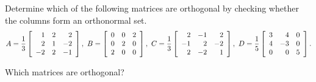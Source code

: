 \documentclass{ximera}
\begin{document}
\begin{problem}
  Determine which of the following matrices are orthogonal by checking
  whether the columns form an orthonormal set.
  \begin{equation*}
    A = \frac{1}{3}
    \startmat{rrr}
      1  &  2 &  2 \\
      2  &  1 & -2 \\
      -2 &  2 & -1 \\
    \stopmat,
    \quad
    B = \startmat{rrr}
      0 & 0 & 2 \\
      0 & 2 & 0 \\
      2 & 0 & 0 \\
    \stopmat,
    \quad
    C = \frac{1}{3}
    \startmat{rrr}
      2  & -1 &  2 \\
      -1 &  2 & -2 \\
      2  & -2 &  1 \\
    \stopmat,
    \quad
    D =
    \frac{1}{5}
    \startmat{rrr}
      3 &  4 & 0 \\
      4 & -3 & 0 \\
      0 &  0 & 5 \\
    \stopmat.
  \end{equation*}
  
  Which matrices are orthogonal?
  \begin{selectAll}
  \end{selectAll}
  
\end{problem}
\end{document}
